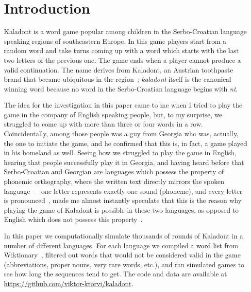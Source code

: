 \section{Introduction}

Kaladont is a word game popular among children in the Serbo-Croatian language speaking regions of southeastern Europe.
In this game players start from a random word and take turns coming up with a word which starts with the last two letters of the previous one.
The game ends when a player cannot produce a valid continuation.
The name derives from Kaladont, an Austrian toothpaste brand that became ubiquitous in the region~\cite{kalodont_wiki}; \textit{kaladont} itself is the canonical winning word because no word in the Serbo-Croatian language begins with \textit{nt}.

The idea for the investigation in this paper came to me when I tried to play the game in the company of English speaking people, but, to my surprise, we struggled to come up with more than three or four words in a row.
Coincidentally, among those people was a guy from Georgia who was, actually, the one to initiate the game, and he confirmed that this is, in fact, a game played in his homeland as well.
Seeing how we struggled to play the game in English, hearing that people successfully play it in Georgia, and having heard before that Serbo-Croatian and Georgian are languages which possess the property of phonemic orthography, where the written text directly mirrors the spoken language — one letter represents exactly one sound (phoneme), and every letter is pronounced~\cite{katz1992, seymour2003}, made me almost instantly speculate that this is the reason why playing the game of Kaladont is possible in these two languages, as opposed to English which does not possess this property~\cite{seymour2003}.

In this paper we computationally simulate thousands of rounds of Kaladont in a number of different languages.
For each language we compiled a word list from Wiktionary~\cite{kaikki}, filtered out words that would not be considered valid in the game (abbreviations, proper nouns, very rare words, etc.), and ran simulated games to see how long the sequences tend to get.
The code and data are available at \url{https://github.com/viktor-ktorvi/kaladont}.
